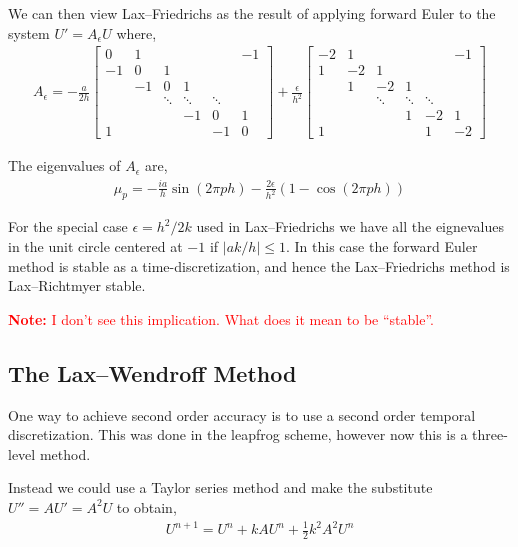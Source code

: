 \documentclass[12pt]{article}
\newcommand{\note}[1]{\textcolor{red}{\textbf{Note:} #1}}
\begin{document}
We can then view Lax--Friedrichs as the result of applying forward Euler to the system \( U' = A_\epsilon U \) where,
\begin{align*}
    A_\epsilon = -\frac{a}{2h} 
    \left[\begin{array}{cccccc}
        0 & 1 & & & & -1 \\
        -1 & 0 & 1\\
        &-1 & 0 & 1\\
        & &\ddots &\ddots & \ddots \\
        & & & -1 & 0 & 1 \\
        1 & & & & -1 & 0
    \end{array}\right]
    +\frac{\epsilon}{h^2}
    \left[\begin{array}{cccccc}
        -2 & 1 & & & & -1 \\
        1 & -2 & 1\\
        &1 & -2 & 1\\
        & &\ddots &\ddots & \ddots \\
        & & & 1 & -2 & 1 \\
        1 & & & & 1 & -2
    \end{array}\right]
\end{align*}

The eigenvalues of \( A_\epsilon \) are,
\begin{align*}
    \mu_p = -\frac{ia}{h}\sin(2\pi ph) - \frac{2\epsilon}{h^2}(1-\cos(2\pi ph))
\end{align*}

For the special case \( \epsilon = h^2/2k \) used in Lax--Friedrichs we have all the eignevalues in the unit circle centered at \( -1 \) if \( |ak/h|\leq 1 \). In this case the forward Euler method is stable as a time-discretization, and hence the Lax--Friedrichs method is Lax--Richtmyer stable.

\note{I don't see this implication. What does it mean to be ``stable''.} 

\subsection{The Lax--Wendroff Method}
One way to achieve second order accuracy is to use a second order temporal discretization. This was done in the leapfrog scheme, however now this is a three-level method.

Instead we could use a Taylor series method and make the substitute \( U'' = AU' = A^2 U \) to obtain,
\begin{align*}
    U^{n+1} = U^n + kAU^n + \frac{1}{2} k^2A^2 U^n
\end{align*}
\end{document}
